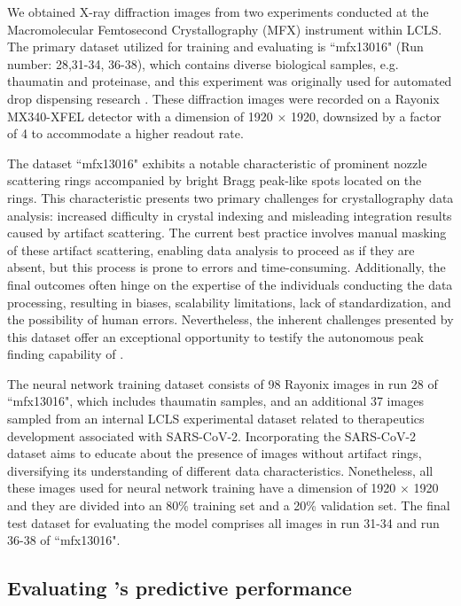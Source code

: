 \documentclass[a4paper]{article}
\begin{document}
We obtained X-ray diffraction images from two experiments conducted at the
Macromolecular Femtosecond Crystallography (MFX) instrument within LCLS.  The
primary dataset utilized for training and evaluating \peaknet{} is ``mfx13016"
(Run number: 28,31-34, 36-38), which contains diverse biological samples, e.g.
thaumatin and proteinase, and this experiment was originally used for automated
drop dispensing research \citep{suSerialCrystallographyUsing2021}.  These
diffraction images were recorded on a Rayonix MX340-XFEL detector with a
dimension of 1920 $\times$ 1920, downsized by a factor of 4 to accommodate a
higher readout rate.  

The dataset ``mfx13016" exhibits a notable characteristic of prominent nozzle
scattering rings accompanied by bright Bragg peak-like spots located on the
rings.  This characteristic presents two primary challenges for crystallography
data analysis: increased difficulty in crystal indexing and misleading
integration results caused by artifact scattering.  The current best practice
involves manual masking of these artifact scattering, enabling data analysis to
proceed as if they are absent, but this process is prone to errors and
time-consuming.  Additionally, the final outcomes often hinge on the expertise
of the individuals conducting the data processing, resulting in biases,
scalability limitations, lack of standardization, and the possibility of human
errors.  Nevertheless, the inherent challenges presented by this dataset offer
an exceptional opportunity to testify the autonomous peak finding capability of
\peaknet{}.

The neural network training dataset consists of 98 Rayonix images in run 28 of
``mfx13016", which includes thaumatin samples, and an additional 37 images
sampled from an internal LCLS experimental dataset related to therapeutics
development associated with SARS-CoV-2.  Incorporating the SARS-CoV-2 dataset
aims to educate \peaknet{} about the presence of images without artifact rings,
diversifying its understanding of different data characteristics.  Nonetheless,
all these images used for neural network training have a dimension of 1920
$\times$ 1920 and they are divided into an 80\% training set and a 20\%
validation set.  The final test dataset for evaluating the model comprises all
images in run 31-34 and run 36-38 of ``mfx13016".


\subsection{Evaluating \peaknet{}'s predictive performance}
\end{document}
